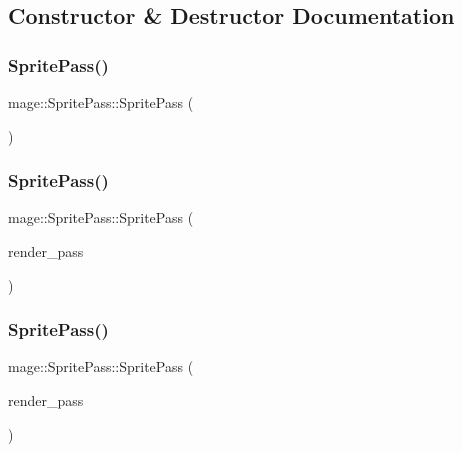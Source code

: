 \subsection{Constructor \& Destructor Documentation}
\hypertarget{classmage_1_1_sprite_pass_abe484eb7c99dabc585d874029c85013f}{}\label{classmage_1_1_sprite_pass_abe484eb7c99dabc585d874029c85013f} 
\subsubsection{\texorpdfstring{Sprite\+Pass()}{SpritePass()}\hspace{0.1cm}{\footnotesize\ttfamily [1/3]}}
{\footnotesize\ttfamily mage\+::\+Sprite\+Pass\+::\+Sprite\+Pass (\begin{DoxyParamCaption}{ }\end{DoxyParamCaption})}

\hypertarget{classmage_1_1_sprite_pass_ac24c782ce252cbbe179aab2277507a87}{}\label{classmage_1_1_sprite_pass_ac24c782ce252cbbe179aab2277507a87} 
\subsubsection{\texorpdfstring{Sprite\+Pass()}{SpritePass()}\hspace{0.1cm}{\footnotesize\ttfamily [2/3]}}
{\footnotesize\ttfamily mage\+::\+Sprite\+Pass\+::\+Sprite\+Pass (\begin{DoxyParamCaption}\item[{const \hyperlink{classmage_1_1_sprite_pass}{Sprite\+Pass} \&}]{render\+\_\+pass }\end{DoxyParamCaption})\hspace{0.3cm}{\ttfamily [delete]}}

\hypertarget{classmage_1_1_sprite_pass_a2af9ccc7970eeff94293638d0cd26d16}{}\label{classmage_1_1_sprite_pass_a2af9ccc7970eeff94293638d0cd26d16} 
\subsubsection{\texorpdfstring{Sprite\+Pass()}{SpritePass()}\hspace{0.1cm}{\footnotesize\ttfamily [3/3]}}
{\footnotesize\ttfamily mage\+::\+Sprite\+Pass\+::\+Sprite\+Pass (\begin{DoxyParamCaption}\item[{\hyperlink{classmage_1_1_sprite_pass}{Sprite\+Pass} \&\&}]{render\+\_\+pass }\end{DoxyParamCaption})\hspace{0.3cm}{\ttfamily [default]}}

